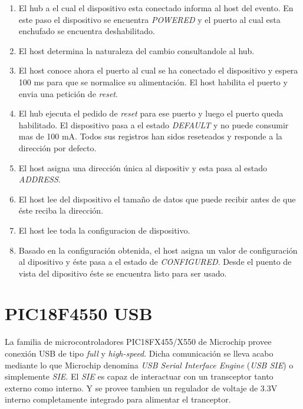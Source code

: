 \begin{enumerate}
 \item El hub a el cual el dispositivo esta conectado informa al host del
evento. En este paso el dispositivo se encuentra \emph{POWERED} y el puerto al
cual esta enchufado se encuentra deshabilitado.
 \item El host determina la naturaleza del cambio consultandole al hub.
 \item El host conoce ahora el puerto al cual se ha conectado el dispositivo y
espera 100 ms para que se normalice su alimentaci\'on. El host habilita el
puerto y envia una petici\'on de \emph{reset}.
 \item El hub ejecuta el pedido de \emph{reset} para ese puerto y luego el
puerto queda habilitado. El dispositivo pasa a el estado \emph{DEFAULT} y no
puede consumir mas de 100 mA. Todos sus registros han sidos reseteados y
responde a la direcci\'on por defecto.
 \item El host asigna una direcci\'on \'unica al dispositiv y esta pasa al
estado \emph{ADDRESS}.
 \item El host lee del dispositivo el tama\~no de datos que puede recibir antes
de que \'este reciba la direcci\'on.
 \item El host lee toda la configuracion de dispositivo.
 \item Basado en la configuraci\'on obtenida, el host asigna un valor de
configuraci\'on al dipositivo y \'este pasa a el estado de \emph{CONFIGURED}.
Desde el puento de vista del dipositivo \'este se encuentra listo para ser
usado.
\end{enumerate}

\newpage
\section{PIC18F4550 USB}
La familia de microcontroladores PIC18FX455/X550 de Microchip provee
conexi\'on USB de tipo \emph{full} y \emph{high-speed}. Dicha comunicaci\'on
se lleva acabo mediante lo que Microchip denomina \emph{USB Serial Interface
Engine} (\emph{USB SIE}) o simplemente \emph{SIE}. 
El \emph{SIE} es capaz de interactuar con un transceptor tanto externo como
interno. Y se provee tambien un regulador de voltaje de 3.3V interno
completamente integrado para alimentar el tranceptor.

